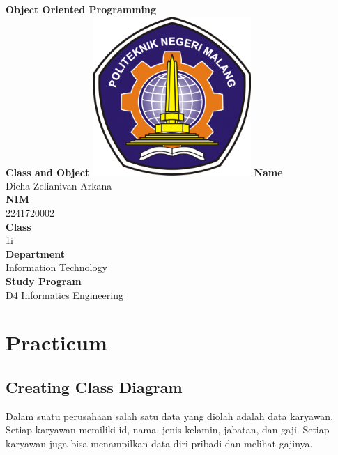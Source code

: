 \documentclass[12pt,titlepage]{article}
\newcommand{\vSubject}{Object Oriented Programming}
\newcommand{\vSubtitle}{Class and Object}
\newcommand{\vName}{Dicha Zelianivan Arkana}
\newcommand{\vNIM}{2241720002}
\newcommand{\vClass}{1i}
\newcommand{\vDepartment}{Information Technology}
\newcommand{\vStudyProgram}{D4 Informatics Engineering}
\begin{document}
\begin{titlepage}
    \centering
    \vfill
    {\bfseries\LARGE
        \vSubject\\
        \vskip0.25cm
        \vSubtitle
    }
    \vfill
    \includegraphics[width=6cm]{images/polinema-logo.png}
    \vfill
    {
        \textbf{Name}\\
        \vName\\
        \vskip0.5cm
        \textbf{NIM}\\
        \vNIM\\
        \vskip0.5cm
        \textbf{Class}\\
        \vClass\\
        \vskip0.5cm
        \textbf{Department}\\
        \vDepartment\\
        \vskip0.5cm
        \textbf{Study Program}\\
        \vStudyProgram
    }
\end{titlepage}

\renewcommand{\umldrawcolor}{black}
\renewcommand{\umlfillcolor}{white}

\section{Practicum}
\subsection{Creating Class Diagram}

Dalam suatu perusahaan salah satu data yang diolah adalah data karyawan. Setiap
karyawan memiliki id, nama, jenis kelamin, jabatan, dan gaji. Setiap karyawan
juga bisa menampilkan data diri pribadi dan melihat gajinya.
\end{document}
